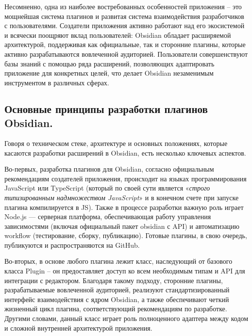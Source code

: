 \documentclass[14pt]{extarticle}
\begin{document}
	Несомненно, одна из наиболее востребованных особенностей приложения – это мощнейшая система плагинов и развитая система взаимодействия разработчиков с пользователями. Создатели приложения активно работают над его экосистемой и всячески поощряют вклад пользователей: Obsidian обладает расширяемой архитектурой, поддерживая как официальные, так и сторонние плагины, которые активно разрабатываются вовлеченной аудиторией. Пользователи совершенствуют базы знаний с помощью ряда расширений, позволяющих адаптировать приложение для конкретных целей, что делает Obsidian незаменимым инструментом в различных сферах.
	
	
	\newpage
	\subsection{Основные принципы разработки плагинов Obsidian.}
	\vspace{1em}
	Говоря о техническом стеке, архитектуре и основных положениях, которые касаются разработки расширений в Obsidian, есть несколько ключевых аспектов.
	
	Во-первых, разработка плагинов для Obsidian, согласно официальным рекомендациям создателей приложения, происходит на языках программирования JavaScript или TypeScript (который по своей сути является «\textit{строго типизированным надмножеством JavaScript}» \cite{TS} и в конечном счете при запуске плагина компилируется в JS). Также в процессе разработки важную роль играет Node.js — серверная платформа, обеспечивающая работу управления зависимостями (включая официальный пакет obsidian с API) и автоматизацию workflow (тестирование, сборку, публикацию). Готовые плагины, в свою очередь, публикуются и распространяются на GitHub.
	
	Во-вторых, в основе любого плагина лежит класс, наследующий от базового класса Plugin – он предоставляет доступ ко всем необходимым типам и API для интеграции с редактором. Благодаря такому подходу, сторонние плагины, разрабатываемые вовлеченной аудиторией, реализуют стандартизированный интерфейс взаимодействия с ядром Obsidian, а также обеспечивают четкий жизненный цикл плагина, соответствующий рекомендациям по разработке. Другими словами, данный класс играет роль полноценного адаптера между кодом и сложной внутренней архитектурой приложения.
	\vspace{1em}
	
\end{document}
